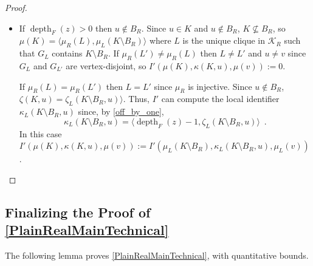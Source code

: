 \documentclass{patmorin}
\let\eqref\cref
\newcommand{\vida}[1]{\noindent{\color{pink} VD: #1}}
\newcommand{\gwen}[1]{\noindent\textcolor{Purple}{GJ: #1}}
\newcommand{\piotr}[1]{\noindent\textcolor{red}{PiMi: #1}}
\DeclareMathOperator{\depth}{depth}
\begin{document}
\begin{proof}
\begin{itemize}
\begin{itemize}
        \item If $\depth_F(z)>0$ then $u\not\in B_R$.  Since $u\in K$ and $u\not\in B_R$, $K\not\subseteq B_R$, so $\mu(K)=\langle \mu_R(L),\mu_{L}(K\setminus B_R)\rangle$ where $L$ is the unique clique in $\mathcal{K}_R$ such that $G_L$ contains $K\setminus B_R$.  If $\mu_R(L')\neq \mu_R(L)$ then $L\neq L'$ and $u\neq v$ since $G_{L}$ and $G_{L'}$ are vertex-disjoint, so $I'(\mu(K),\kappa(K,u),\mu(v)):=0$.

        If $\mu_R(L)=\mu_R(L')$ then $L=L'$ since $\mu_R$ is injective.
        Since $u\not\in B_R$,  $\zeta(K,u)=\zeta_L(K\setminus B_R,u)\rangle$.
        Thus, $I'$ can compute the local identifier $\kappa_L(K\setminus B_R,u)$ since, by \eqref{off_by_one},
        \[
           \kappa_L(K\setminus B_R,u) = \langle \depth_F(z)-1, \zeta_L(K\setminus B_R,u)\rangle\enspace.
        \]
        In this case $I'(\mu(K),\kappa(K,u),\mu(v)):=I'(\mu_L(K\setminus B_R),\kappa_L(K\setminus B_R,u),\mu_L(v))$. \qedhere
    \end{itemize}
  \end{itemize}
  \end{proof}



\subsection{Finalizing the Proof of \cref{PlainRealMainTechnical}}


The following lemma proves \cref{PlainRealMainTechnical}, with quantitative bounds.

\end{document}
